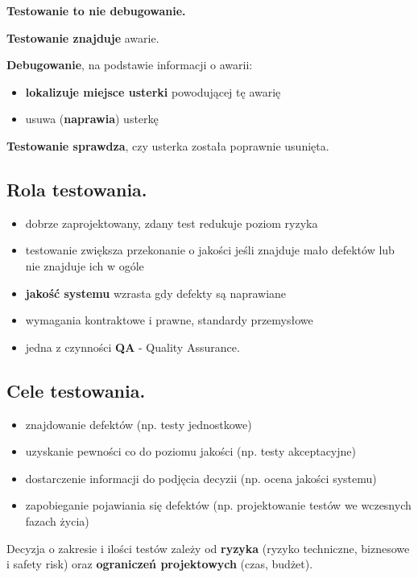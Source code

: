 \documentclass[../main.tex]{subfiles}
\begin{document}
    \textbf{Testowanie to nie debugowanie.}

    \textbf{Testowanie znajduje} awarie.

    \textbf{Debugowanie}, na podstawie informacji o awarii:
    \begin{itemize}
        \item \textbf{lokalizuje miejsce usterki} powodującej tę awarię
        \item usuwa (\textbf{naprawia}) usterkę
    \end{itemize}

    \textbf{Testowanie sprawdza}, czy usterka została poprawnie usunięta.

    \subsection{Rola testowania.}
    \begin{itemize}
        \item dobrze zaprojektowany, zdany test
        redukuje poziom ryzyka
        \item testowanie zwiększa przekonanie o
        jakości jeśli znajduje mało defektów
        lub nie znajduje ich w ogóle
        \item \textbf{jakość systemu} wzrasta gdy defekty są naprawiane
        \item wymagania kontraktowe i prawne, standardy przemysłowe
        \item jedna z czynności \textbf{QA} - Quality Assurance.
    \end{itemize}

    \subsection{Cele testowania.}
    \begin{itemize}
        \item znajdowanie defektów (np. testy jednostkowe)
        \item uzyskanie pewności co do poziomu jakości (np. testy akceptacyjne)
        \item dostarczenie informacji do podjęcia decyzii (np. ocena jakości systemu)
        \item zapobieganie pojawiania się defektów (np. projektowanie testów we wczesnych fazach życia)
    \end{itemize}

    Decyzja o zakresie i ilości testów zależy od \textbf{ryzyka} (ryzyko techniczne, biznesowe i safety risk)
    oraz \textbf{ograniczeń projektowych} (czas, budżet).
\end{document}
